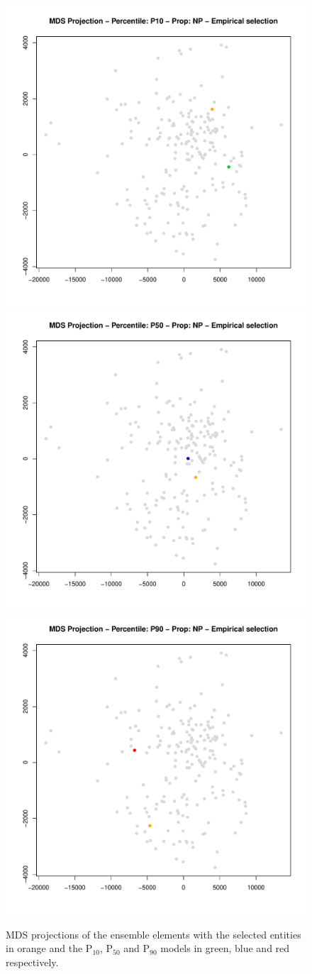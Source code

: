 \documentclass[final,5p,times,twocolumn]{elsarticle}
\begin{document}
\begin{figure}[H]
  \centering
  \includegraphics[width=0.49\columnwidth]{mds-ecdf-NP-p10.pdf}
  \includegraphics[width=0.49\columnwidth]{mds-ecdf-NP-p50.pdf}
  \includegraphics[width=0.49\columnwidth]{mds-ecdf-NP-p90.pdf}
  \caption{MDS projections of the ensemble elements with the selected entities in orange and the P$_{10}$, P$_{50}$ and P$_{90}$ models in green, blue and red respectively.}
  \label{fig:mds-ecdf}
\end{figure}

\end{document}
